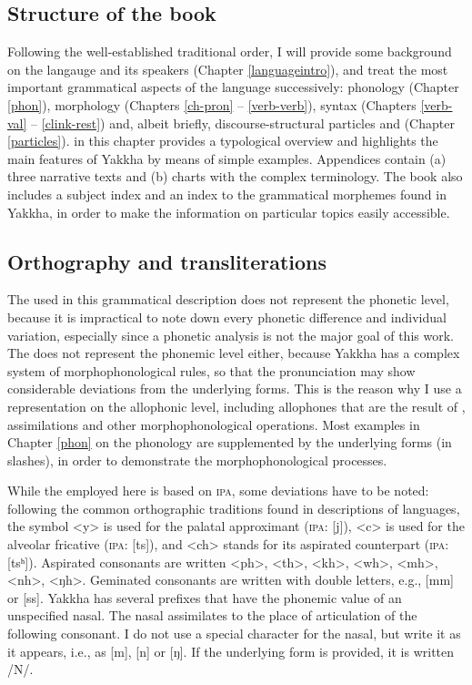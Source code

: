 \subsection{Structure of the book}


Following the well-established traditional order, I will provide some background on the langauge and its speakers (Chapter \ref{languageintro}), and treat the most important grammatical aspects of the language successively: phonology (Chapter \ref{phon}), morphology (Chapters \ref{ch-pron} – \ref{verb-verb}), syntax (Chapters \ref{verb-val} – \ref{clink-rest}) and, albeit briefly, discourse-structural particles and  (Chapter \ref{particles}).  in this chapter provides a typological overview and highlights the main features of Yakkha by means of simple examples. Appendices contain (a) three narrative texts and  (b) charts with the complex  terminology. The book also includes  a subject index and an index to the grammatical morphemes found in Yakkha, in order to make the information on particular topics easily accessible. 

\subsection{Orthography and transliterations}\label{orth}

The  used in this grammatical description does not represent the phonetic level, because it is impractical to note down every phonetic difference and individual variation, especially since a phonetic analysis is not the major goal of this work. The  does not represent the phonemic level either, because Yakkha has a complex system of morphophonological rules, so that the pronunciation may show considerable deviations from the underlying forms. This is the reason why I use a representation on the allophonic level, including allophones that are the result of , assimilations and other morphophonological operations. Most examples in Chapter \ref{phon} on the phonology  are supplemented by the underlying forms (in slashes), in order to demonstrate the morphophonological processes.

While the   employed here is based on \textsc{ipa}, some deviations have to be noted: following the common orthographic traditions found in descriptions of  languages, the symbol <y> is used for the palatal approximant (\textsc{ipa}: [j]), <c> is used for the alveolar fricative (\textsc{ipa}: [ts]), and <ch> stands for its aspirated counterpart (\textsc{ipa}: [tsʰ]). Aspirated consonants are written <ph>, <th>, <kh>, <wh>, <mh>, <nh>, <ŋh>. Geminated consonants are written with double letters, e.g., [mm] or [ss]. Yakkha has several prefixes that have the phonemic value of an unspecified  nasal. The nasal assimilates to the place of articulation of the following consonant. I do not use a special character for the nasal, but write it as it appears, i.e., as [m], [n] or [ŋ]. If the underlying form is provided, it is written /N/. 

